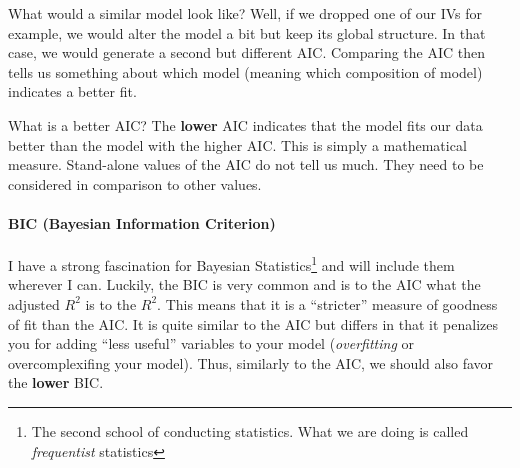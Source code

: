 \documentclass[
  letterpaper,
  DIV=11,
  numbers=noendperiod]{scrreprt}
\let\oldparagraph\paragraph
\renewcommand{\paragraph}[1]{\oldparagraph{#1}\mbox{}}
\begin{document}
What would a similar model look like? Well, if we dropped one of our IVs
for example, we would alter the model a bit but keep its global
structure. In that case, we would generate a second but different AIC.
Comparing the AIC then tells us something about which model (meaning
which composition of model) indicates a better fit.

What is a better AIC? The \textbf{lower} AIC indicates that the model
fits our data better than the model with the higher AIC. This is simply
a mathematical measure. Stand-alone values of the AIC do not tell us
much. They need to be considered in comparison to other values.

\hypertarget{bic-bayesian-information-criterion}{%
\paragraph{BIC (Bayesian Information
Criterion)}\label{bic-bayesian-information-criterion}}

I have a strong fascination for Bayesian
Statistics\footnote{The second school of conducting statistics. What we are doing is called \emph{frequentist} statistics}
and will include them wherever I can. Luckily, the BIC is very common
and is to the AIC what the adjusted \(R^2\) is to the \(R^2\). This
means that it is a ``stricter'' measure of goodness of fit than the AIC.
It is quite similar to the AIC but differs in that it penalizes you for
adding ``less useful'' variables to your model (\emph{overfitting} or
overcomplexifing your model). Thus, similarly to the AIC, we should also
favor the \textbf{lower} BIC.
\end{document}
